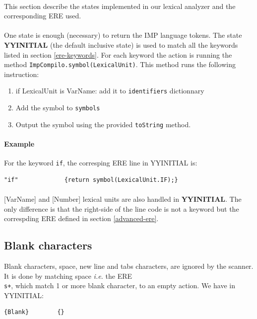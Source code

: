 \documentclass[letterpaper]{article}
\begin{document}
\paragraph{}

This section describe the states implemented in our
lexical analyzer and the corresponding ERE used.

\paragraph{}

One state is enough (necessary) to return the IMP language tokens.
The state \textbf{YYINITIAL} (the default inclusive state) is used to match
all the keywords listed in section \ref{ere-keywords}. For each keyword
the action is running the method \texttt{ImpCompilo.symbol(LexicalUnit)}.
This method runs the following instruction:
\begin{enumerate}
    \item if LexicalUnit is VarName: add it to \texttt{identifiers} dictionnary
    \item Add the symbol to \texttt{symbols}
    \item Output the symbol using the provided \texttt{toString} method.
\end{enumerate}
\paragraph{Example}

For the keyword \texttt{if}, the corresping ERE line in YYINITIAL is:

\begin{lstlisting}[frame=single]
"if"             {return symbol(LexicalUnit.IF);}
\end{lstlisting}

\paragraph{}
[VarName] and [Number] lexical units are also handled in \textbf{YYINITIAL}.
The only difference is that the right-side of the line code is not a keyword
but the correspding ERE defined in section \ref{advanced-ere}.

\subsection{Blank characters}

Blank characters, space, new line and tabs characters,
are ignored by the scanner. It is
done by matching space \textit{i.e.} the ERE \texttt{\\s+}, which match
1 or more blank character, to an empty action. We have in YYINITIAL:
\begin{lstlisting}[frame=single]
{Blank}        {}
\end{lstlisting}
\end{document}
